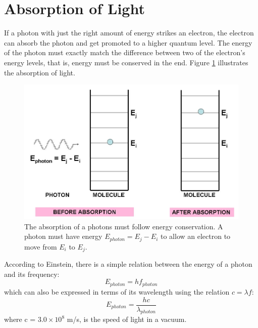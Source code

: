 \section{Absorption of Light}

If a photon with just the right amount of energy strikes an electron, the electron can absorb the photon and get promoted to a higher quantum level.  The energy of the photon must exactly match the difference between two of the electron’s energy levels, that is, energy must be conserved in the end.  Figure \ref{Fig6-4} illustrates the absorption of light.
\begin{figure}[h]
	\centering
	\includegraphics[width=\textwidth]{./figures/Topic6/Fig6-4.png}
	\caption{The absorption of a photons must follow energy conservation. A photon must have energy $E_{photon} = E_j - E_i$ to allow an electron to move from $E_i$ to $E_j$.}
	\label{Fig6-4}
\end{figure}
According to Einstein, there is a simple relation between the energy of a photon and its frequency:
\begin{equation}\label{eqn6-8}
E_{photon}=hf_{photon}
\end{equation}
which can also be expressed in terms of its wavelength using the relation $c=\lambda f$:
\begin{equation}\label{eqn6-9}
E_{photon}=\frac{hc}{\lambda_{photon}}
\end{equation}
where c = $3.0\times10^8$ m/s, is the speed of light in a vacuum.
 
